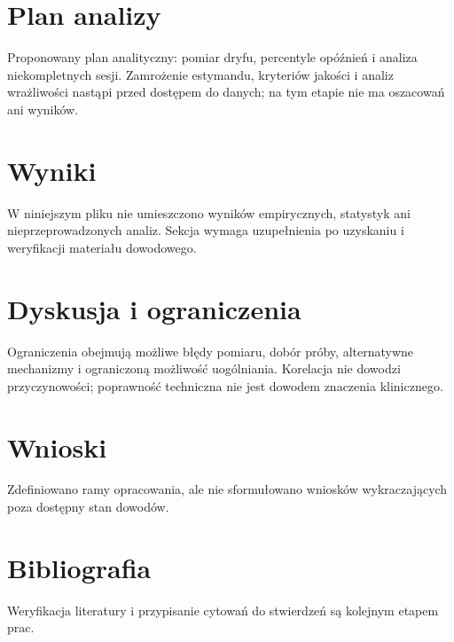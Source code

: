 \documentclass[11pt,a4paper]{article}
\begin{document}
\section{Plan analizy}

Proponowany plan analityczny: pomiar dryfu, percentyle opóźnień i analiza niekompletnych sesji. Zamrożenie estymandu, kryteriów jakości i analiz wrażliwości nastąpi przed dostępem do danych; na tym etapie nie ma oszacowań ani wyników.

\section{Wyniki}

W niniejszym pliku nie umieszczono wyników empirycznych, statystyk ani nieprzeprowadzonych analiz. Sekcja wymaga uzupełnienia po uzyskaniu i weryfikacji materiału dowodowego.

\section{Dyskusja i ograniczenia}

Ograniczenia obejmują możliwe błędy pomiaru, dobór próby, alternatywne mechanizmy i ograniczoną możliwość uogólniania. Korelacja nie dowodzi przyczynowości; poprawność techniczna nie jest dowodem znaczenia klinicznego.

\section{Wnioski}

Zdefiniowano ramy opracowania, ale nie sformułowano wniosków wykraczających poza dostępny stan dowodów.

\section*{Bibliografia}

Weryfikacja literatury i przypisanie cytowań do stwierdzeń są kolejnym etapem prac.
\end{document}

